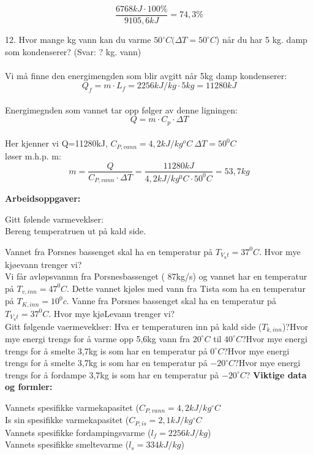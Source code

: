 \documentclass{minmal}
\begin{document}
$$\frac{6768kJ\cdot 100\%}{9105,6kJ}=74,3\%$$

12. Hvor mange kg vann kan du varme $50^\circ C (\Delta T=50^\circ C$) når du har 5 kg. damp som kondenserer? (Svar: ? kg. vann)\\\\
Vi må finne den energimengden som blir avgitt når 5kg damp kondenserer:\\
$$Q_f=m\cdot L_f=2256kJ/kg\cdot 5kg=11280kJ$$\\
Energimegnden som vannet tar opp følger av denne ligningen:\\
$$Q=m\cdot C_p\cdot \Delta T$$\\
Her kjenner vi Q=11280kJ, $C_{P,vann}=4,2kJ/kg^oC\ \Delta T=50^0C$\\
løser m.h.p.  m:
$$m=\frac{Q}{C_{P,vann}\cdot \Delta T}=\frac{11280kJ}{4,2kJ/kg^0C\cdot 50^0C }=53,7kg$$
\newpage
\begin{center}
    
{\textbf{Arbeidsoppgaver:}}
\end{center}
Gitt følende varmeveklser:\\
Bereng temperatruen ut på kald side.\newpage

Vannet fra Porsnes bassenget skal ha en temperatur på $T_{V_ut}=37^0C.$  Hvor mye kjøevann trenger vi?\\
Vi får avløpsvanmn fra Porsnesbassenget ( 87kg/s) og vannet har en temperatur på $T_{v,inn}=47^0C$.  Dette vannet kjøles med vann fra Tista som ha en temperatur på $T_{K,inn}=10^0c.$  Vanne fra Porsnes bassenget skal ha en temperatur på $T_{V_ut}=37^0C.$  Hvor mye kjøLevann trenger vi?\\
\newpage
Gitt følgende vaermeveklser:
Hva er temperaturen inn på kald side ($T_{k,inn}$)?\nl[2]
Hvor mye energi trengs for å varme opp 5,6kg vann fra $20^\circ C$ til $40^\circ C$?\nl[2]
Hvor mye energi trengs for å smelte 3,7kg is som har en temperatur på $0^\circ C$?\nl[2]
Hvor mye energi trengs for å smelte 3,7kg is som har en temperatur på $-20^\circ C$?\nl[2]
Hvor mye energi trengs for å fordampe 3,7kg is som har en temperatur på $-20^\circ C$?\newpage
\noindent\textbf{Viktige data og formler:}\nl[2]

\noindent Vannets spesifikke varmekapasitet  ($C_{P,vann}=4,2kJ/kg^\circ C$\\
Is sin spesifikke varmekapasitet  ($C_{P,is}=2,1kJ/kg^\circ C$\\
Vannets spesifikke fordampingsvarme  ($l_f=2256kJ/kg$)\\
Vannets spesifikke smeltevarme  ($l_s=334kJ/kg$)\nl[2]
\end{document}
